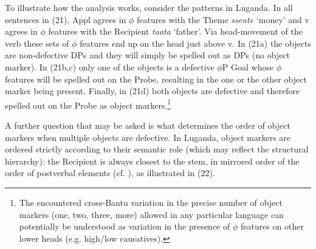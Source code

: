 \documentclass[output=paper
,modfonts
,nonflat]{langsci/langscibook}
\begin{document}
To illustrate how the analysis works, consider the patterns in Luganda. In all sentences in (21), Appl agrees in $\phi $ features with the Theme \textit{ssente} ‘money’ and v agrees in $\phi$ features with the Recipient \textit{taata} ‘father’. Via head-movement of the verb these sets of $\phi$ features end up on the head just above v. In (21a) the objects are non-defective DPs and they will simply be spelled out as DPs (no object marker). In (21b,c) only one of the objects is a defective $\phi$P Goal whose $\phi$ features will be spelled out on the Probe, resulting in the one or the other object marker being present. Finally, in (21d) both objects are defective and therefore spelled out on the Probe as object markers.\footnote{The encountered cross-Bantu variation in the precise number of object markers (one, two, three, more) allowed in any particular language \citep{Polak1986, Marlo2015} can potentially be understood as variation in the presence of $\phi$ features on other lower heads (e.g. high/low causatives).}

A further question that may be asked is what determines the order of object markers when multiple objects are defective. In Luganda, object markers are ordered strictly according to their semantic role (which may reflect the structural hierarchy): the Recipient is always closest to the stem, in mirrored order of the order of postverbal elements (cf. \citealt{Baker1985, Baker1988}), as illustrated in (22).
\end{document}
